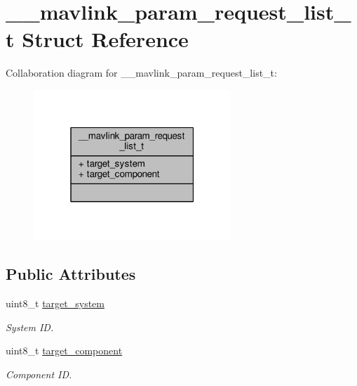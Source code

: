 \hypertarget{struct____mavlink__param__request__list__t}{\section{\+\_\+\+\_\+mavlink\+\_\+param\+\_\+request\+\_\+list\+\_\+t Struct Reference}
\label{struct____mavlink__param__request__list__t}
}


Collaboration diagram for \+\_\+\+\_\+mavlink\+\_\+param\+\_\+request\+\_\+list\+\_\+t\+:
\nopagebreak
\begin{figure}[H]
\begin{center}
\leavevmode
\includegraphics[width=211pt]{struct____mavlink__param__request__list__t__coll__graph}
\end{center}
\end{figure}
\subsection*{Public Attributes}
\begin{DoxyCompactItemize}
\item 
\hypertarget{struct____mavlink__param__request__list__t_aae3ba45d3ff75c3603ec6bf4eb58b244}{uint8\+\_\+t \hyperlink{struct____mavlink__param__request__list__t_aae3ba45d3ff75c3603ec6bf4eb58b244}{target\+\_\+system}}\label{struct____mavlink__param__request__list__t_aae3ba45d3ff75c3603ec6bf4eb58b244}

\begin{DoxyCompactList}\small\item\em System I\+D. \end{DoxyCompactList}\item 
\hypertarget{struct____mavlink__param__request__list__t_adf6602f61af11ec222fdabd850abdf2d}{uint8\+\_\+t \hyperlink{struct____mavlink__param__request__list__t_adf6602f61af11ec222fdabd850abdf2d}{target\+\_\+component}}\label{struct____mavlink__param__request__list__t_adf6602f61af11ec222fdabd850abdf2d}

\begin{DoxyCompactList}\small\item\em Component I\+D. \end{DoxyCompactList}\end{DoxyCompactItemize}


